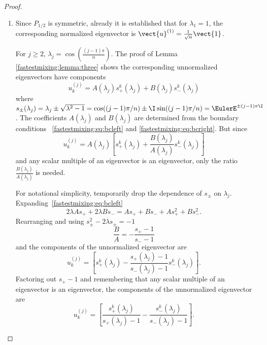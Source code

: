 \documentclass[12pt]{article}
\begin{document}
\begin{proof}
    \begin{enumerate}
        \item
            Since \( P_{1/2} \) is symmetric, already it is established
            that for \( \lambda_1 = 1 \), the corresponding normalized
            eigenvector is \( \vect{u}^{(1)} = \frac{1}{\sqrt{n}}\vect{1}
            \).

            For \( j \ge 2 \), \( \lambda_j = \cos\left( \frac{(j-1) \pi}
            {n} \right) \).  The proof of Lemma~%
            \ref{fastestmixing:lemma:three} shows the corresponding
            unnormalized eigenvectors have components
            \[
                u^{(j)}_k = A(\lambda_j) s_{+}^k(\lambda_j) + B(\lambda_j)s_
                {-}^k(\lambda_j)
            \] where \( s_{\pm}(\lambda_j) = \lambda_j \pm \sqrt{\lambda^2
            - 1} = \cos((j-1) \pi/n) \pm \I \sin((j-1) \pi/n) = \EulerE^
            {\pm (j-1) \pi \I} \).  The coefficients \( A(\lambda_j) \)
            and \( B(\lambda_j) \) are determined from the boundary
            conditions~%
            \eqref{fastestmixing:eq:bcleft} and%
            \eqref{fastestmixing:eq:bcright}.  But since
            \[
                u^{(j)}_k = A(\lambda_j) \left[ s_{+}^k(\lambda_j) +
                \frac{B(\lambda_j)}{A(\lambda_j)}s_{-}^k(\lambda_j)
                \right]
            \] and any scalar multiple of an eigenvector is an
            eigenvector, only the ratio \( \frac{B(\lambda_j)}{A(\lambda_j)}
            \) is needed.

            For notational simplicity, temporarily drop the dependence
            of \( s_{\pm} \) on \( \lambda_j \). Expanding~\eqref{fastestmixing:eq:bcleft}
            \[
                2\lambda A s_+ + 2 \lambda B s_{-} = A s_+ + B s_- + A s_+^2
                + B s_-^2.
            \] Rearranging and using \( s_{\pm}^2 - 2\lambda s_{\pm} =
            -1 \)
            \[
                \frac{B}{A} = - \frac{s_+ - 1}{s_- - 1}
            \] and the components of the unnormalized eigenvector are
            \[
                u_k^{(j)} = \left[ s_+^k(\lambda_j) - \frac{s_+(\lambda_j)
                - 1}{s_-(\lambda_j) - 1} s_-^k(\lambda_j) \right].
            \] Factoring out \( s_+ - 1 \) and remembering that any
            scalar multiple of an eigenvector is an eigenvector, the
            components of the unnormalized eigenvector are
            \[
                u_k^{(j)} = \left[ \frac{s_+^k(\lambda_j)}{s_+(\lambda_j)
                - 1} - \frac{s_-^k(\lambda_j)}{s_-(\lambda_j) - 1}
                \right].
            \]


\end{enumerate}
\end{proof}
\end{document}
